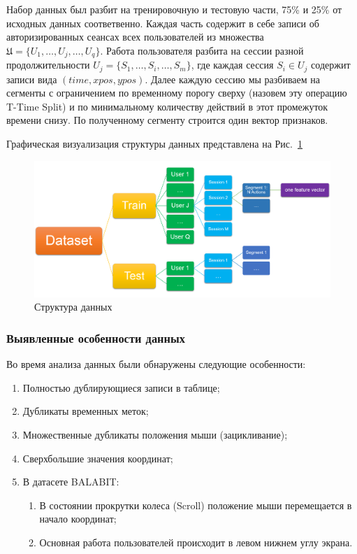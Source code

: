 \documentclass[12pt]{article}
\begin{document}
    \par Набор данных был разбит на тренировочную и тестовую части, 75\% и 25\% от исходных данных соответвенно. Каждая часть содержит в себе записи об авторизированных сеансах всех пользователей из множества $\mathfrak{U}=\{U_1, \ldots, U_j, \ldots, U_q\}$. Работа пользователя разбита на сессии разной продолжительности $U_j = \{S_1, \ldots, S_i, \ldots, S_m\}$, где каждая сессия $S_i \in U_j$ содержит записи вида $(time, xpos, ypos)$. Далее каждую сессию мы разбиваем на сегменты с ограничением по временному порогу сверху (назовем эту операцию T-Time Split) и по минимальному количеству действий в этот промежуток времени снизу. По полученному сегменту строится один вектор признаков.

    \par Графическая визуализация структуры данных представлена на Рис.~\ref{sec:Research:Data:Description:fig:DataStructure}

    \begin{figure}[h!]
        \centering
        \includegraphics[width=\linewidth]{DataStructure.png}
        \caption{Структура данных}
        \label{sec:Research:Data:Description:fig:DataStructure}
    \end{figure}

    \newpage


    \subsubsection{Выявленные особенности данных}
    \label{sec:Research:Data:Features}

    \noindent Во время анализа данных были обнаружены следующие особенности:

    \begin{enumerate}
        \item Полностью дублирующиеся записи в таблице;
        \item Дубликаты временных меток;
        \item Множественные дубликаты положения мыши (зацикливание);
        \item Сверхбольшие значения координат;
        \item В датасете BALABIT:
        \begin{enumerate}
            \item В состоянии прокрутки колеса (Scroll) положение мыши перемещается в начало координат;
            \item Основная работа пользователей происходит в левом нижнем углу экрана.
        \end{enumerate}
    \end{enumerate}
\end{document}
